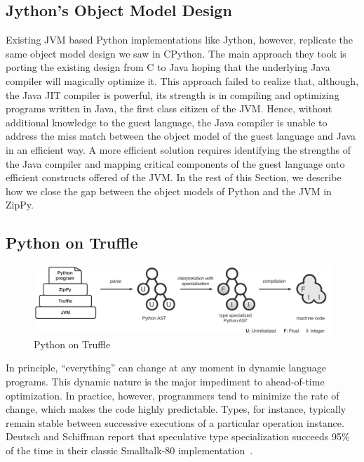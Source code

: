 \subsection{Jython's Object Model Design}

Existing JVM based Python implementations like Jython, however, replicate the same object model design we saw in CPython.
The main approach they took is porting the existing design from C to Java hoping that the underlying Java compiler will magically optimize it.
This approach failed to realize that, although, the Java JIT compiler is powerful, its strength is in compiling and optimizing programs written in Java,
the first class citizen of the JVM.
Hence, without additional knowledge to the guest language, the Java compiler is unable to address the miss match between the object model of the guest language and Java in an efficient way.
A more efficient solution requires identifying the strengths of the Java compiler and mapping critical components of the guest language onto efficient constructs offered of the JVM.
In the rest of this Section, we describe how we close the gap between the object models of Python and the JVM in ZipPy.

\subsection{Python on Truffle}

\begin{figure}[!ht]
\centering
\includegraphics[scale=0.50]{figures/python-on-truffle.pdf}
\caption{Python on Truffle}
\label{fig:python_on_truffle}
\end{figure}

In principle, ``everything'' can change at any moment in dynamic language programs.
This dynamic nature is the major impediment to ahead-of-time optimization.
In practice, however, programmers tend to minimize the rate of change, which makes the code highly predictable.
Types, for instance, typically remain stable between successive executions of a particular operation instance.
Deutsch and Schiffman report that speculative type specialization succeeds 95\% of the time in their classic Smalltalk-80 implementation~\cite{Deutsch1984}.

